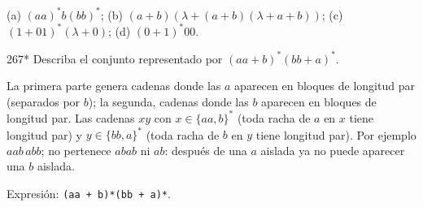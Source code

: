 \documentclass[11pt]{article}
\begin{document}
\resp (a) $(aa)^*b(bb)^*$; (b) $(a + b)(\lambda + (a + b)(\lambda + a + b))$; (c) $(1 + 01)^*(\lambda + 0)$; (d) $(0 + 1)^*00$.


\begin{ejercicio}{267}{*}
Describa el conjunto representado por $(aa + b)^*(bb + a)^*$.
\end{ejercicio}
\proc La primera parte genera cadenas donde las $a$ aparecen en bloques de longitud par (separados por $b$); la segunda, cadenas donde las $b$ aparecen en bloques de longitud par.
\resp Las cadenas $xy$ con $x \in \{aa, b\}^*$ (toda racha de $a$ en $x$ tiene longitud par) y $y \in \{bb, a\}^*$ (toda racha de $b$ en $y$ tiene longitud par). Por ejemplo $aab\,abb$; no pertenece $abab$ ni $ab$: después de una $a$ aislada ya no puede aparecer una $b$ aislada.\par Expresión: \texttt{(aa + b)*(bb + a)*}.
\end{document}
